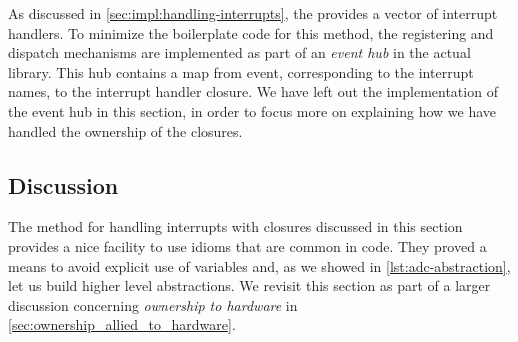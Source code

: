 As discussed in \autoref{sec:impl:handling-interrupts}, the {\gecko} provides a vector of interrupt handlers.
To minimize the boilerplate code for this method, the registering and dispatch mechanisms are implemented as part of an \emph{event hub} in the actual library.
This hub contains a map from event, corresponding to the interrupt names, to the interrupt handler closure.
We have left out the implementation of the event hub in this section, in order to focus more on explaining how we have handled the ownership of the closures.

\subsection{Discussion}

The method for handling interrupts with closures discussed in this section provides a nice facility to use idioms that are common in {\rust} code.
They proved a means to avoid explicit use of {\unsafe}  variables and, as we showed in \autoref{lst:adc-abstraction}, let us build higher level abstractions.
We revisit this section as part of a larger discussion concerning \emph{ownership to hardware} in \autoref{sec:ownership_allied_to_hardware}.



